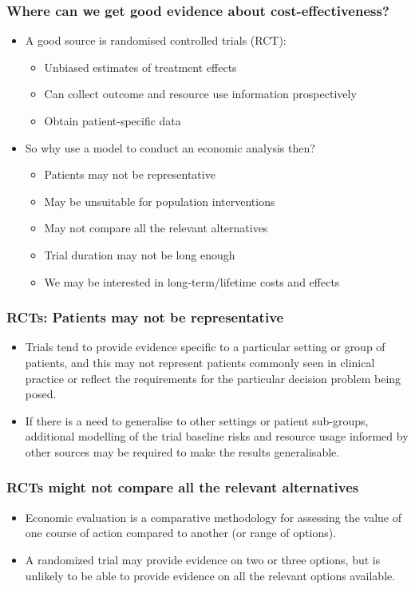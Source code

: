 \begin{frame}
\frametitle{Where can we get good evidence about cost-effectiveness?}
\begin{itemize}
\item A good source is \alert{randomised controlled trials (RCT)}:
	\begin{itemize}
		\item Unbiased estimates of treatment effects
		\item Can collect outcome and resource use information prospectively
		\item Obtain patient-specific data
	\end{itemize}
\item So why use a model to conduct an economic analysis then?
	\begin{itemize}
		\pause
		\item Patients may not be representative
		\pause
		\item May be unsuitable for population interventions
		\pause
		\item May not compare all the relevant alternatives
		\pause
		\item Trial duration may not be long enough
		\pause
		\item We may be interested in long-term/lifetime costs and effects
	\end{itemize}
\end{itemize}
\end{frame}

\begin{frame}
\frametitle{RCTs: Patients may not be representative}

	\begin{itemize}
		\item Trials tend to provide evidence \alert{specific} to a particular setting or group of patients, and this may not represent patients commonly seen in \alert{clinical practice} or reflect the requirements for the particular decision problem being posed.
		\item If there is a need to generalise to other settings or patient sub-groups, additional modelling of the trial baseline risks and resource usage informed by other sources may be required to make the results \alert{generalisable}.
\end{itemize}
\end{frame}


\begin{frame}
\frametitle{RCTs might not compare all the relevant alternatives}

	\begin{itemize}
		\item Economic evaluation is a comparative methodology for assessing the value of one course of action compared to another (or range of options).
		\item A randomized trial may provide evidence on two or three options, but is unlikely to be able to provide evidence on \alert{all the relevant options} available.
\end{itemize}
\end{frame}


